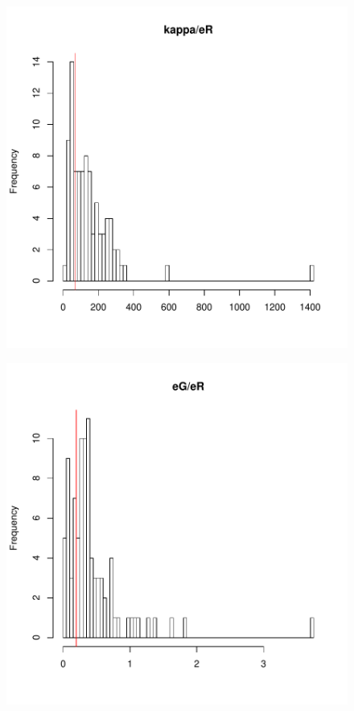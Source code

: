 \documentclass[12pt,reqno,final]{amsart}
\theoremstyle{plain}
\numberwithin{equation}{part}
\begin{document}
\begin{figure}
\includegraphics{Solving_the_problem_of_parameter_covariation-008}
\end{figure}

\begin{figure}
\includegraphics{Solving_the_problem_of_parameter_covariation-009}
\end{figure}
\end{document}
